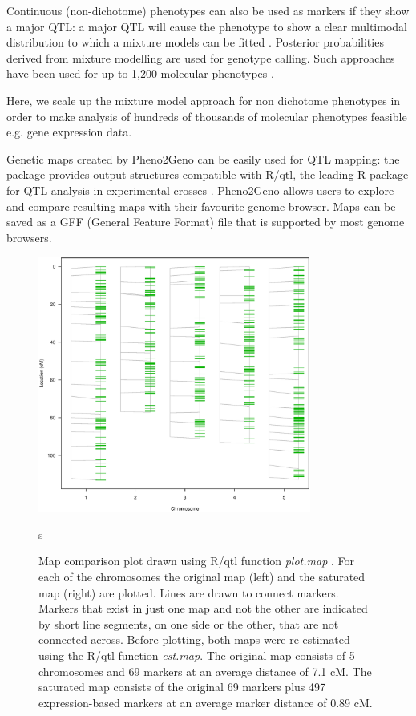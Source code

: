 Continuous (non-dichotome) phenotypes can also be used as markers if they show a major QTL: a 
major QTL will cause the phenotype to show a clear multimodal distribution to which a mixture 
models can be fitted \cite{Jansen:1993, Jansen:2001a}. Posterior probabilities derived from 
mixture modelling are used for genotype calling. Such approaches have been used for up to 
1,200 molecular phenotypes \cite{Gort:2010}.

Here, we scale up the mixture model approach for non dichotome phenotypes in order to make 
analysis of hundreds of thousands of molecular phenotypes feasible e.g. gene expression data.

Genetic maps created by Pheno2Geno can be easily used for QTL mapping: the package provides 
output structures compatible with R/qtl, the leading R package for QTL analysis in 
experimental crosses \cite{Broman:2003, Arends:2010}. Pheno2Geno allows users to 
explore and compare resulting maps with their favourite genome browser. Maps can be saved
as a GFF (General Feature Format) file that is supported by most genome browsers.

\begin{figure}[h!]
  \centering
  \includegraphics[keepaspectratio,width=0.8\textwidth]{eps/image_2_1.eps}
  \caption[Map comparison]{Map comparison plot drawn using R/qtl function \emph{plot.map} \cite{Broman:2003, Arends:2010}. For 
          each of the chromosomes the original map (left) and the saturated map (right) are plotted. Lines are drawn
          to connect markers.  Markers that exist in just one map and not the other are indicated by short line 
          segments, on one side or the other, that are not connected across. Before plotting, both maps were 
          re-estimated using the R/qtl function \emph{est.map}. The original map consists of 5 chromosomes and 69 
          markers at an average distance of 7.1 cM. The saturated map consists of the original 69 markers plus 497 
          expression-based markers at an average marker distance of 0.89 cM.}
          s\label{fig:mapcomparison}
\end{figure}

